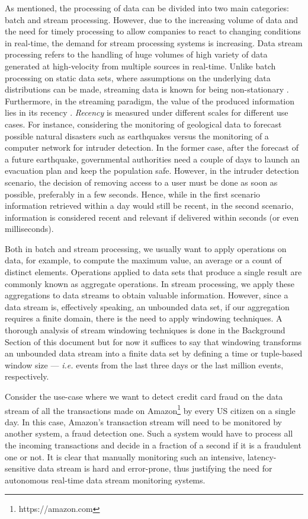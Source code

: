 As mentioned, the processing of data can be divided into two main categories: batch and stream processing. However, due to the increasing volume of data and the need for timely processing to allow companies to react to changing conditions in real-time, the demand for stream processing systems is increasing. Data stream processing refers to the handling of huge volumes of high variety of data generated at high-velocity from multiple sources in real-time. Unlike batch processing on static data sets, where assumptions on the underlying data distributions can be made, streaming data is known for being non-stationary \cite{Gama-Knowledge-Discovery}. Furthermore, in the streaming paradigm, the value of the produced information lies in its recency \cite{Kolajo-Big-data-stream-SLR}. \textit{Recency} is measured under different scales for different use cases. For instance, considering the monitoring of geological data to forecast possible natural disasters such as earthquakes versus the monitoring of a computer network for intruder detection. In the former case, after the forecast of a future earthquake, governmental authorities need a couple of days to launch an evacuation plan and keep the population safe. However, in the intruder detection scenario, the decision of removing access to a user must be done as soon as possible, preferably in a few seconds. Hence, while in the first scenario information retrieved within a day would still be recent, in the second scenario, information is considered recent and relevant if delivered within seconds (or even milliseconds).

Both in batch and stream processing, we usually want to apply operations on data, for example, to compute the maximum value, an average or a count of distinct elements. Operations applied to data sets that produce a single result are commonly known as aggregate operations. In stream processing, we apply these aggregations to data streams to obtain valuable information. However, since a data stream is, effectively speaking, an unbounded data set, if our aggregation requires a finite domain, there is the need to apply windowing techniques. A thorough analysis of stream windowing techniques is done in the Background Section of this document but for now it suffices to say that windowing transforms an unbounded data stream into a finite data set by defining a time or tuple-based window size --- \textit{i.e.} events from the last three days or the last million events, respectively.

Consider the use-case where we want to detect credit card fraud on the data stream of all the transactions made on Amazon\footnote{https://amazon.com} by every US citizen on a single day. In this case, Amazon's transaction stream will need to be monitored by another system, a fraud detection one. Such a system would have to process all the incoming transactions and decide in a fraction of a second if it is a fraudulent one or not. It is clear that manually monitoring such an intensive, latency-sensitive data stream is hard and error-prone, thus justifying the need for autonomous real-time data stream monitoring systems.

